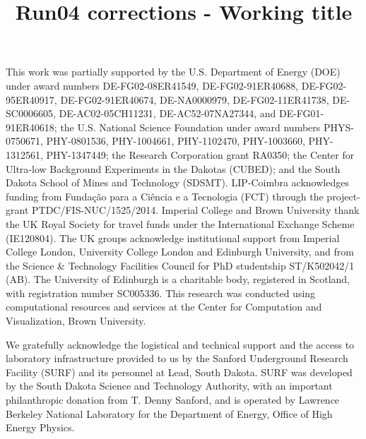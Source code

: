 \documentclass[twocolumn,superscriptaddress,prd]{revtex4-1}
\begin{document}
\title{Run04 corrections - Working title}





\maketitle










\appendix

%


\begin{acknowledgments}

This work was partially supported by the U.S. Department of Energy (DOE) under award numbers DE-FG02-08ER41549, DE-FG02-91ER40688, DE-FG02-95ER40917, DE-FG02-91ER40674, DE-NA0000979, DE-FG02-11ER41738, DE-SC0006605, DE-AC02-05CH11231, DE-AC52-07NA27344, and DE-FG01-91ER40618; the U.S. National Science Foundation under award numbers PHYS-0750671, PHY-0801536, PHY-1004661, PHY-1102470, PHY-1003660, PHY-1312561, PHY-1347449; the Research Corporation grant RA0350; the Center for Ultra-low Background Experiments in the Dakotas (CUBED); and the South Dakota School of Mines and Technology (SDSMT). LIP-Coimbra acknowledges funding from Funda\c{c}\~{a}o para a Ci\^{e}ncia e a Tecnologia (FCT)   through the project-grant PTDC/FIS-NUC/1525/2014. Imperial College and Brown University thank the UK Royal Society for travel funds under the International Exchange Scheme (IE120804). The UK groups acknowledge institutional support from Imperial College London, University College London and Edinburgh University, and from the Science \& Technology Facilities Council for PhD studentship ST/K502042/1 (AB). The University of Edinburgh is a charitable body, registered in Scotland, with registration number SC005336. This research was conducted using computational resources and services at the Center for Computation and Visualization, Brown University.

We gratefully acknowledge the logistical and technical support and the access to laboratory infrastructure provided to us by the Sanford Underground Research Facility (SURF) and its personnel at Lead, South Dakota. SURF was developed by the South Dakota Science and Technology Authority, with an important philanthropic donation from T. Denny Sanford, and is operated by Lawrence Berkeley National Laboratory for the Department of Energy, Office of High Energy Physics.

\end{acknowledgments}


\newpage
\thispagestyle{empty}
\mbox{}
\newpage
\thispagestyle{empty}
\mbox{}

%


\end{document}
